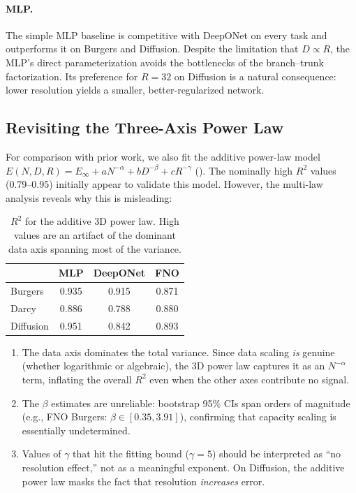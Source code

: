 \documentclass[11pt]{article}
\newcommand{\Einf}{E_\infty}
\begin{document}
\paragraph{MLP.}
The simple MLP baseline is competitive with DeepONet on every task and
outperforms it on Burgers and Diffusion. Despite the limitation that
$D \propto R$, the MLP's direct parameterization avoids the bottlenecks
of the branch--trunk factorization. Its preference for $R = 32$ on
Diffusion is a natural consequence: lower resolution yields a smaller,
better-regularized network.

\subsection{Revisiting the Three-Axis Power Law}

For comparison with prior work, we also fit the additive power-law model
$E(N,D,R) = \Einf + aN^{-\alpha} + bD^{-\beta} + cR^{-\gamma}$
(). The nominally high $R^2$ values (0.79--0.95)
initially appear to validate this model. However, the multi-law
analysis reveals why this is misleading:

\begin{table}[h]
\centering
\caption{$R^2$ for the additive 3D power law. High values are an
artifact of the dominant data axis spanning most of the variance.}
\label{tab:3d-r2}
\begin{tabular}{@{}lccc@{}}
\toprule
& \textbf{MLP} & \textbf{DeepONet} & \textbf{FNO} \\
\midrule
Burgers   & 0.935 & 0.915 & 0.871 \\
Darcy     & 0.886 & 0.788 & 0.880 \\
Diffusion & 0.951 & 0.842 & 0.893 \\
\bottomrule
\end{tabular}
\end{table}

\begin{enumerate}
  \item The data axis dominates the total variance. Since data scaling
    \emph{is} genuine (whether logarithmic or algebraic), the 3D
    power law captures it as an $N^{-\alpha}$ term, inflating the
    overall $R^2$ even when the other axes contribute no signal.
  \item The $\beta$ estimates are unreliable: bootstrap 95\% CIs span
    orders of magnitude (e.g., FNO Burgers: $\beta \in [0.35, 3.91]$),
    confirming that capacity scaling is essentially undetermined.
  \item Values of $\gamma$ that hit the fitting bound ($\gamma = 5$)
    should be interpreted as ``no resolution effect,'' not as a
    meaningful exponent. On Diffusion, the additive power law masks the
    fact that resolution \emph{increases} error.
\end{enumerate}
\end{document}
